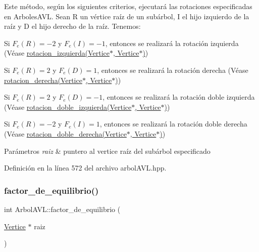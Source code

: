 Este método, según los siguientes criterios, ejecutará las rotaciones especificadas en Arboles\+A\+VL. Sean R un vértice raíz de un subárbol, I el hijo izquierdo de la raíz y D el hijo derecho de la raíz. Tenemos\+:
\begin{DoxyItemize}
\item Si $F_e(R) = -2$ y $F_e(I) = -1$, entonces se realizará la rotación izquierda (Véase \hyperlink{classArbolAVL_abfaf2247b607b040e328391ec8621546}{rotacion\+\_\+izquierda(\+Vertice$\ast$, Vertice$\ast$)})
\item Si $F_e(R) = 2$ y $F_e(D) = 1$, entonces se realizará la rotación derecha (Véase \hyperlink{classArbolAVL_a33dfba0b6e53caa0f2e4b71a8d2c6a7e}{rotacion\+\_\+derecha(\+Vertice$\ast$, Vertice$\ast$)})
\item Si $F_e(R) = 2$ y $F_e(D) = -1$, entonces se realizará la rotación doble izquierda (Véase \hyperlink{classArbolAVL_a3115c59bd2be761c530eeeb11a169700}{rotacion\+\_\+doble\+\_\+izquierda(\+Vertice$\ast$, Vertice$\ast$)})
\item Si $F_e(R) = -2$ y $F_e(I) = 1$, entonces se realizará la rotación doble derecha (Véase \hyperlink{classArbolAVL_aa481f6a1014b68159b1fe753b96bde62}{rotacion\+\_\+doble\+\_\+derecha(\+Vertice$\ast$, Vertice$\ast$)}) 
\begin{DoxyParams}{Parámetros}
{\em raiz} & puntero al vertice raíz del subárbol especificado \\
\hline
\end{DoxyParams}

\end{DoxyItemize}

Definición en la línea 572 del archivo arbol\+A\+V\+L.\+hpp.

\mbox{\label{classArbolAVL_a12f2ddd1c095720faf96b5685a94e13e}} 
\subsubsection{\texorpdfstring{factor\+\_\+de\+\_\+equilibrio()}{factor\_de\_equilibrio()}\hspace{0.1cm}{\footnotesize\ttfamily [1/2]}}
{\footnotesize\ttfamily int Arbol\+A\+V\+L\+::factor\+\_\+de\+\_\+equilibrio (\begin{DoxyParamCaption}\item[{\hyperlink{classVertice}{Vertice} $\ast$}]{raiz }\end{DoxyParamCaption})\hspace{0.3cm}{\ttfamily [protected]}}



